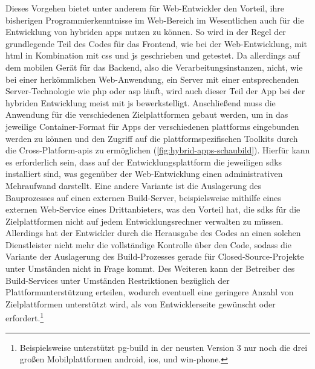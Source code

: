 Dieses Vorgehen bietet unter anderem für Web-Entwickler den Vorteil, ihre bisherigen Programmierkenntnisse im Web-Bereich im Wesentlichen auch für die Entwicklung von hybriden \glspl{app} nutzen zu können. 
So wird in der Regel der grundlegende Teil des Codes für das Frontend, wie bei der Web-Entwicklung, mit \gls{html} in Kombination mit \gls{css} und \gls{js} geschrieben und getestet. 
Da allerdings auf dem mobilen Gerät für das Backend, also die Verarbeitungsinstanzen, nicht, wie bei einer herkömmlichen Web-Anwendung, ein Server mit einer entsprechenden Server-Technologie wie \gls{php} oder \gls{asp} läuft, wird auch dieser Teil der App bei der hybriden Entwicklung meist mit \gls{js} bewerkstelligt. 
Anschließend muss die Anwendung für die verschiedenen Zielplattformen gebaut werden, um in das jeweilige Container-Format für Apps der verschiedenen \glspl{plattform} eingebunden werden zu können und den Zugriff auf die plattformspezifischen Toolkits durch die Cross-Platform-\glspl{api} zu ermöglichen (\autoref{fig:hybrid-apps-schaubild}).
Hierfür kann es erforderlich sein, dass auf der Entwicklungsplattform die jeweiligen \glspl{sdk} installiert sind, was gegenüber der Web-Entwicklung einen administrativen Mehraufwand darstellt.
Eine andere Variante ist die Auslagerung des Bauprozesses auf einen externen Build-Server, beispielsweise mithilfe eines externen Web-Service eines Drittanbieters, was den Vorteil hat, die \glspl{sdk} für die Zielplattformen nicht auf jedem Entwicklungsrechner verwalten zu müssen. 
Allerdings hat der Entwickler durch die Herausgabe des Codes an einen solchen Dienstleister nicht mehr die vollständige Kontrolle über den Code, sodass die Variante der Auslagerung des Build-Prozesses gerade für Closed-Source-Projekte unter Umständen nicht in Frage kommt. 
Des Weiteren kann der Betreiber des Build-Services unter Umständen Restriktionen bezüglich der Plattformunterstützung erteilen, wodurch eventuell eine geringere Anzahl von Zielplattformen unterstützt wird, als von Entwicklerseite gewünscht oder erfordert.\footnote{Beispielsweise unterstützt \gls{pg-build} in der neusten Version 3 nur noch die drei großen Mobilplattformen \gls{android}, \gls{ios}, und \gls{win-phone}.}

